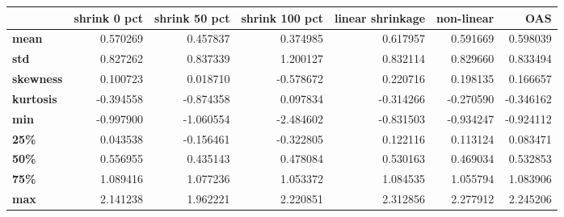 \begin{tabular}{lrrrrrr}
\toprule
{} &  shrink 0 pct &  shrink 50 pct &  shrink 100 pct &  linear shrinkage &  non-linear &       OAS \\
\midrule
\textbf{mean    } &      0.570269 &       0.457837 &        0.374985 &          0.617957 &    0.591669 &  0.598039 \\
\textbf{std     } &      0.827262 &       0.837339 &        1.200127 &          0.832114 &    0.829660 &  0.833494 \\
\textbf{skewness} &      0.100723 &       0.018710 &       -0.578672 &          0.220716 &    0.198135 &  0.166657 \\
\textbf{kurtosis} &     -0.394558 &      -0.874358 &        0.097834 &         -0.314266 &   -0.270590 & -0.346162 \\
\textbf{min     } &     -0.997900 &      -1.060554 &       -2.484602 &         -0.831503 &   -0.934247 & -0.924112 \\
\textbf{25\%     } &      0.043538 &      -0.156461 &       -0.322805 &          0.122116 &    0.113124 &  0.083471 \\
\textbf{50\%     } &      0.556955 &       0.435143 &        0.478084 &          0.530163 &    0.469034 &  0.532853 \\
\textbf{75\%     } &      1.089416 &       1.077236 &        1.053372 &          1.084535 &    1.055794 &  1.083906 \\
\textbf{max     } &      2.141238 &       1.962221 &        2.220851 &          2.312856 &    2.277912 &  2.245206 \\
\bottomrule
\end{tabular}
